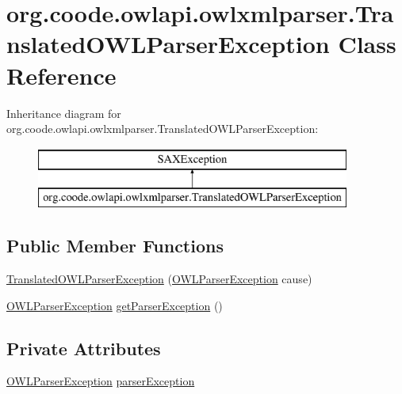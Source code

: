 \hypertarget{classorg_1_1coode_1_1owlapi_1_1owlxmlparser_1_1_translated_o_w_l_parser_exception}{\section{org.\-coode.\-owlapi.\-owlxmlparser.\-Translated\-O\-W\-L\-Parser\-Exception Class Reference}
\label{classorg_1_1coode_1_1owlapi_1_1owlxmlparser_1_1_translated_o_w_l_parser_exception}
}
Inheritance diagram for org.\-coode.\-owlapi.\-owlxmlparser.\-Translated\-O\-W\-L\-Parser\-Exception\-:\begin{figure}[H]
\begin{center}
\leavevmode
\includegraphics[height=2.000000cm]{classorg_1_1coode_1_1owlapi_1_1owlxmlparser_1_1_translated_o_w_l_parser_exception}
\end{center}
\end{figure}
\subsection*{Public Member Functions}
\begin{DoxyCompactItemize}
\item 
\hyperlink{classorg_1_1coode_1_1owlapi_1_1owlxmlparser_1_1_translated_o_w_l_parser_exception_a7c8c75acb2a9e5650d62e711aeb2db37}{Translated\-O\-W\-L\-Parser\-Exception} (\hyperlink{classorg_1_1semanticweb_1_1owlapi_1_1io_1_1_o_w_l_parser_exception}{O\-W\-L\-Parser\-Exception} cause)
\item 
\hyperlink{classorg_1_1semanticweb_1_1owlapi_1_1io_1_1_o_w_l_parser_exception}{O\-W\-L\-Parser\-Exception} \hyperlink{classorg_1_1coode_1_1owlapi_1_1owlxmlparser_1_1_translated_o_w_l_parser_exception_abbefe15bd54528f03e2ca1e23974f1c8}{get\-Parser\-Exception} ()
\end{DoxyCompactItemize}
\subsection*{Private Attributes}
\begin{DoxyCompactItemize}
\item 
\hyperlink{classorg_1_1semanticweb_1_1owlapi_1_1io_1_1_o_w_l_parser_exception}{O\-W\-L\-Parser\-Exception} \hyperlink{classorg_1_1coode_1_1owlapi_1_1owlxmlparser_1_1_translated_o_w_l_parser_exception_ab06b1605f3c1bb0a6393dd7d54d1676f}{parser\-Exception}
\end{DoxyCompactItemize}
